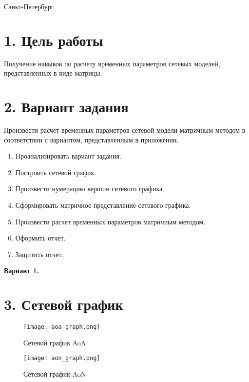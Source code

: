 \documentclass[12pt]{article}
\begin{document}


\vspace{\baselineskip}
\vspace{\baselineskip}
\vspace{\baselineskip}
\vspace{\baselineskip}
\vspace{\baselineskip}
\begin{Center}
Санкт-Петербург \the\year{}
\end{Center}\par

\section*{1. Цель работы}
Получение навыков по расчету временных параметров сетевых моделей, представленных в виде матрицы.

\section*{2. Вариант задания}
Произвести расчет временных параметров сетевой модели матричным методом в соответствии с вариантом, представленным в приложении.

\begin{enumerate}
    \item Проанализировать вариант задания.
    \item Построить сетевой график.
    \item Произвести нумерацию вершин сетевого графика.
    \item Сформировать матричное представление сетевого графика.
    \item Произвести расчет временных параметров матричным методом.
    \item Оформить отчет.
    \item Защитить отчет.
\end{enumerate}

\textbf{Вариант 1.}

\section*{3. Сетевой график}
\begin{figure}[H]
    \centering
    \texttt{[image: aoa\_graph.png]}
    \caption{Сетевой график AoA}
\end{figure}

\begin{figure}[H]
    \centering
    \texttt{[image: aon\_graph.png]}
    \caption{Сетевой график AoN}
\end{figure}
\end{document}
